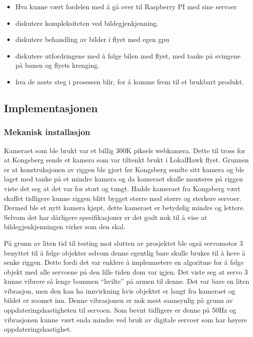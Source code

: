 \begin{itemize}
\item 
Hva kunne vært fordelen med å gå over til Raspberry PI med sine servoer

\item diskutere kompleksiteten ved bildegjenkjenning. 

\item diskutere behandling av bilder i flyet med egen gpu

\item diskutere utfordringene med å følge bilen med flyet, med tanke på svingene på banen og flyets krenging.

\item hva de neste steg i prosessen blir, for å komme frem til et brukbart produkt. 
\end{itemize}

\subsection{Implementasjonen}
 
\subsubsection{Mekanisk installasjon}

Kameraet som ble brukt var et billig 300K piksels webkamera. Dette til tross for at Kongsberg sende et kamera som var tiltenkt brukt i LokalHawk flyet. Grunnen er at konstruksjonen av riggen ble gjort før Kongsberg sendte sitt kamera og ble laget med tanke på et mindre kamera og da kameraet skulle monteres på riggen viste det seg at det var for stort og tungt. Hadde kameraet fra Kongsberg vært skaffet tidligere kunne riggen blitt bygget større med større og sterkere servoer. Dermed ble et nytt kamera kjøpt, dette kameraet er betydelig mindre og lettere. Selvom det har dårligere spesifikasjoner er det godt nok til å vise at bildegjenkjenningen virker som den skal.

På grunn av liten tid til testing mot slutten av prosjektet ble også servomotor 3 benyttet til å følge objekter selvom denne egentlig bare skulle brukes til å heve å senke riggen. Dette fordi det var enklere å implemnetere en algoritme for å følge objekt med alle servoene på den lille tiden dom var igjen. Det viste seg at servo 3 kunne vibrere så lenge bommen ``hvilte'' på armen til denne. Det var bare en liten vibrasjon, men den kan ha innvirkning hvis objektet er langt fra kameraet og bildet er zoomet inn. Denne vibrasjonen er nok mest sannsynlig på grunn av oppdateringshastigheten til servoen. Som bevnt tidligere er denne på 50Hz og vibrasjonen kunne vært enda mindre ved bruk av digitale servoer som har høyere oppdateringshastighet.  
   

